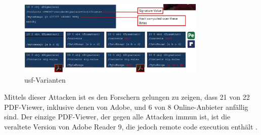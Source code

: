 \begin{figure}[!htbp]
	\centering
	\includegraphics[width=0.8\textwidth]{"images/univ_sig_forgery.png"}
	\caption{\gls{usf}-Varianten \cite{ccc-break-pdf-slides}}
	\label{fig:usf}
\end{figure}

Mittels dieser Attacken ist es den Forschern gelungen zu zeigen, dass 21 von 22 PDF-Viewer, inklusive denen von Adobe, und 6 von 8 Online-Anbieter anfällig sind. Der einzige PDF-Viewer, der gegen alle Attacken immun ist, ist die veraltete Version von Adobe Reader 9, die jedoch remote code execution enthält \cite{ccc-break-pdf}. 